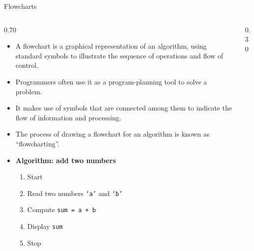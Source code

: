 \documentclass[aspectratio=169]{beamer}
\begin{document}
	\begin{frame}{Flowcharts}
		\vspace*{-0.4cm}
		\begin{columns}[T,onlytextwidth]
			
			
			\begin{column}{0.70\textwidth}
				
				\begin{itemize}
					\item A flowchart is a graphical representation of an algorithm, using standard symbols to illustrate the sequence of operations and flow of control.
					
					\item Programmers often use it as a program-planning tool to solve a problem.
					
					\item It makes use of symbols that are connected among them to indicate
					the flow of information and processing.
					
					\item The process of drawing a flowchart for an algorithm is known as
					``flowcharting''.
					\item \textbf{Algorithm: add two numbers}
					\begin{enumerate}\small
						\item Start
						\item Read two numbers \texttt{`a'} and \texttt{`b'}
						\item Compute \texttt{sum = a + b}
						\item Display \texttt{sum}
						\item Stop
					\end{enumerate}
				\end{itemize}
				
			\end{column}
			
			
			
			\begin{column}{0.30\textwidth}
				\centering
				\vspace{4mm}
				
				\begin{tikzpicture}[remember picture, overlay, scale=0.70,]
					

\end{tikzpicture}
\end{column}
\end{columns}
\end{frame}
\end{document}
